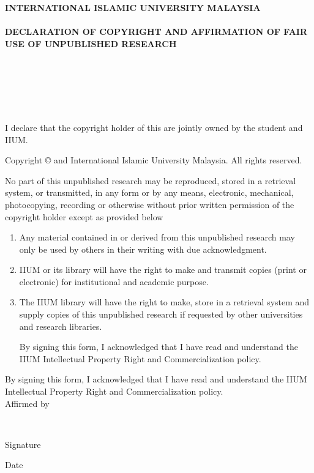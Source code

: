 \documentclass[12pt, a4paper]{memoir}
\begin{document}
\thispagestyle{empty}

\begin{center}
{\fontsize{14bp}{16bp}\selectfont
\textbf{\MakeUppercase{International Islamic University Malaysia}}\\~\\
\textbf{\MakeUppercase{Declaration of Copyright and Affirmation of Fair Use of 
Unpublished Research}}\\~\\
\textbf{\MakeUppercase{\myTitle}}\\
\ifdefined\mySubtitle
\textbf{\MakeUppercase{\mySubtitle}}\\~\\
\else
\\~\\
\fi
}
\noindent I declare that the copyright holder of this 
\myDocument are jointly owned by the student and IIUM.\\
\end{center}

\begin{center}
{\fontsize{10bp}{12bp}\selectfont
\noindent Copyright \copyright{} \myYear \myName and International Islamic 
University 
Malaysia. All rights reserved.}\\
\end{center}

\noindent No part of this unpublished research may be reproduced, stored in a 
retrieval
system, or transmitted, in any form or by any means, electronic, mechanical,
photocopying, recording or otherwise without prior written permission of the
copyright holder except as provided below

\begin{enumerate}
\item Any material contained in or derived from this unpublished research
may only be used by others in their writing with due acknowledgment.

\item IIUM or its library will have the right to make and transmit copies
(print or electronic) for institutional and academic purpose.

\item The IIUM library will have the right to make, store in a retrieval system
and supply copies of this unpublished research if requested by other
universities and research libraries.

By signing this form, I acknowledged that I have read and understand the
IIUM Intellectual Property Right and Commercialization policy.
\end{enumerate}

\noindent By signing this form, I acknowledged that I have read and understand 
the
IIUM Intellectual Property Right and Commercialization policy.\\[48pt]

\noindent Affirmed by \myName\\

\vfill

\noindent \makebox[2in]{\dotfill} \hfill \makebox[2in]{\dotfill}\\
\parbox{2in}{\centering Signature} \hfill \parbox{2in}{\centering Date}
\end{document}
